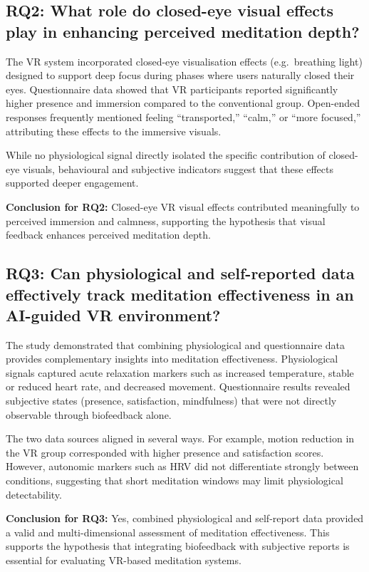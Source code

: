 \subsection*{RQ2: What role do closed-eye visual effects play in enhancing perceived meditation depth?}

The VR system incorporated closed-eye visualisation effects (e.g.\ breathing light) designed to support deep focus during phases where users naturally
closed their eyes. Questionnaire data showed that VR participants reported
significantly higher presence and immersion compared to the conventional group.
Open-ended responses frequently mentioned feeling “transported,” “calm,” or
“more focused,” attributing these effects to the immersive visuals.

While no physiological signal directly isolated the specific contribution of closed-eye visuals, behavioural and subjective indicators suggest that these effects supported deeper engagement.

\textbf{Conclusion for RQ2:}  
Closed-eye VR visual effects contributed meaningfully to perceived immersion
and calmness, supporting the hypothesis that visual feedback enhances perceived
meditation depth.

\subsection*{RQ3: Can physiological and self-reported data effectively track meditation effectiveness in an AI-guided VR environment?}

The study demonstrated that combining physiological and questionnaire data
provides complementary insights into meditation effectiveness. Physiological
signals captured acute relaxation markers such as increased temperature,
stable or reduced heart rate, and decreased movement. Questionnaire results
revealed subjective states (presence, satisfaction, mindfulness) that were not
directly observable through biofeedback alone.

The two data sources aligned in several ways. For example, motion reduction in
the VR group corresponded with higher presence and satisfaction scores.
However, autonomic markers such as HRV did not differentiate strongly between
conditions, suggesting that short meditation windows may limit physiological
detectability.

\textbf{Conclusion for RQ3:}  
Yes, combined physiological and self-report data provided a valid and
multi-dimensional assessment of meditation effectiveness. This supports the
hypothesis that integrating biofeedback with subjective reports is essential
for evaluating VR-based meditation systems.

